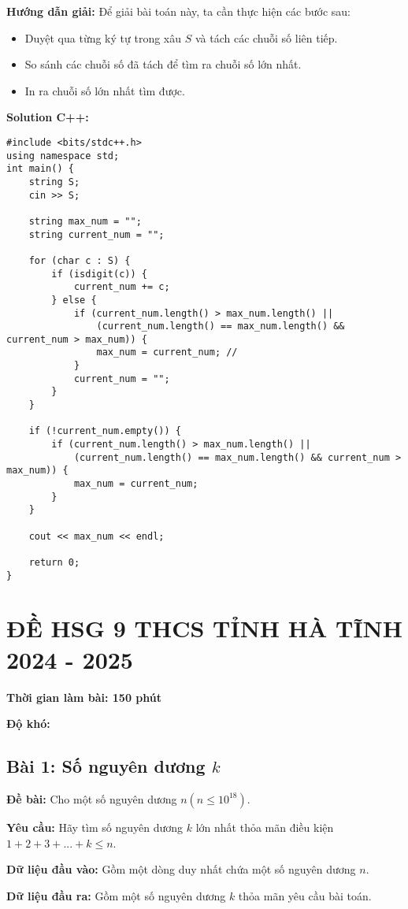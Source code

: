 \documentclass[12pt]{scrartcl}  %
\begin{document}
\textbf{Hướng dẫn giải:}
Để giải bài toán này, ta cần thực hiện các bước sau:
\begin{itemize}
    \item Duyệt qua từng ký tự trong xâu $S$ và tách các chuỗi số liên tiếp.
    \item So sánh các chuỗi số đã tách để tìm ra chuỗi số lớn nhất.
    \item In ra chuỗi số lớn nhất tìm được.
\end{itemize}
\textbf{Solution C++:}
\begin{lstlisting}
#include <bits/stdc++.h>
using namespace std;
int main() {
    string S;
    cin >> S;

    string max_num = "";
    string current_num = "";

    for (char c : S) {
        if (isdigit(c)) {
            current_num += c; 
        } else {
            if (current_num.length() > max_num.length() || 
                (current_num.length() == max_num.length() && current_num > max_num)) {
                max_num = current_num; // 
            }
            current_num = ""; 
        }
    }

    if (!current_num.empty()) {
        if (current_num.length() > max_num.length() || 
            (current_num.length() == max_num.length() && current_num > max_num)) {
            max_num = current_num;
        }
    }

    cout << max_num << endl;

    return 0;
}
\end{lstlisting}

\section{ĐỀ HSG 9 THCS TỈNH HÀ TĨNH 2024 - 2025}

\textbf{Thời gian làm bài: 150 phút}

\textbf{Độ khó: }
\subsection{Bài 1: Số nguyên dương $k$}

\textbf{Đề bài:}
Cho một số nguyên dương $n (n \leq 10^{18})$. 

\textbf{Yêu cầu:}
Hãy tìm số nguyên dương $k$ lớn nhất thỏa mãn điều kiện $1 + 2 + 3 + ... + k \leq n$. 

\textbf{Dữ liệu đầu vào:}
Gồm một dòng duy nhất chứa một số nguyên dương $n$.

\textbf{Dữ liệu đầu ra:}
Gồm một số nguyên dương $k$ thỏa mãn yêu cầu bài toán.
\end{document}
